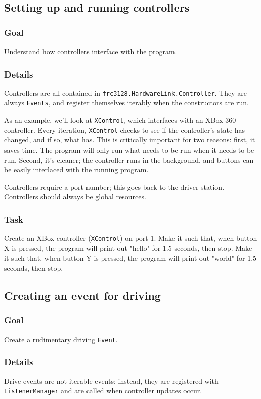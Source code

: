 \documentclass[a4paper]{article}
\begin{document}
\pagebreak\subsection{Setting up and running controllers}
\subsubsection{Goal} Understand how controllers interface with the program.
\subsubsection{Details} Controllers are all contained in \lstinline{frc3128.HardwareLink.Controller}. They are always \lstinline{Events}, and register themselves iterably when the constructors are run. 

As an example, we'll look at \lstinline{XControl}, which interfaces with an XBox 360 controller. Every iteration, \lstinline{XControl} checks to see if the controller's state has changed, and if so, what has. This is critically important for two reasons: first, it saves time. The program will only run what needs to be run when it needs to be run. Second, it's cleaner; the controller runs in the background, and buttons can be easily interlaced with the running program.

Controllers require a port number; this goes back to the driver station. Controllers should always be global resources.
\subsubsection{Task} Create an XBox controller (\lstinline{XControl}) on port 1. Make it such that, when button X is pressed, the program will print out "hello" for 1.5 seconds, then stop. Make it such that, when button Y is pressed, the program will print out "world" for 1.5 seconds, then stop.

\pagebreak\subsection{Creating an event for driving}
\subsubsection{Goal} Create a rudimentary driving \lstinline{Event}.
\subsubsection{Details} Drive events are not iterable events; instead, they are registered with \lstinline{ListenerManager} and are called when controller updates occur. 
\end{document}
